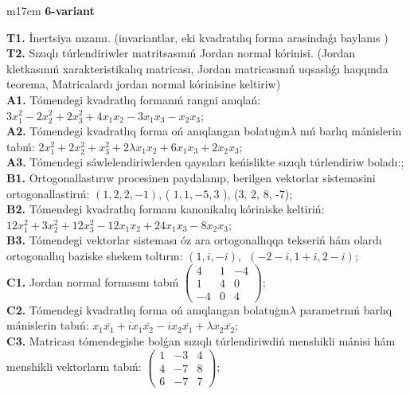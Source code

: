 \documentclass{article}
\begin{document}
\begin{tabular}{m{17cm}}
\textbf{6-variant}
\newline

\textbf{T1.} İnertsiya nızamı. (invariantlar,  eki kvadratılıq forma arasindaǵı baylanıs ) \\
\textbf{T2.} Sızıqlı túrlendiriwler matritsasınıń Jordan normal kórinisi. (Jordan kletkasınıń xarakteristikalıq matricası, Jordan matricasınıń uqsaslıǵı haqqında teorema,  Matricalardı jordan normal kórinisine keltiriw) \\
\textbf{A1.} Tómendegi kvadratlıq formanıń rangni anıqlań: \(3x_{1}^{2} - 2x_{2}^{2} + 2x_{3}^{2} + 4x_{1}x_{2} - 3x_{1}x_{3} - x_{2}x_{3}\); \\
\textbf{A2.} Tómendegi kvadratlıq forma oń anıqlangan bolatuģın\(\lambda\) nıń barlıq mánislerin tabıń: \(2x_{1}^{2} + 2x_{2}^{2} + x_{3}^{2} + 2\lambda x_{1}x_{2} + 6x_{1}x_{3} + 2x_{2}x_{3}\); \\
\textbf{A3.} Tómendegi sáwlelendiriwlerden qaysıları keńislikte sızıqlı túrlendiriw boladı:; \\
\textbf{B1.} Ortogonallastırıw procesinen paydalanıp, berilgen vektorlar sistemasini ortogonallastirıń: \((1,2,2, - 1)\), ( \(1,1, - 5,3\) ), (3, 2, 8, -7); \\
\textbf{B2.} Tómendegi kvadratlıq formanı kanonikalıq kóriniske keltiriń: \(12x_{1}^{2} + 3x_{2}^{2} + 12x_{3}^{2} - 12x_{1}x_{2} + 24x_{1}x_{3} - 8x_{2}x_{3}\); \\
\textbf{B3.} Tómendegi vektorlar sisteması óz ara ortogonallıqqa tekseriń hám olardı ortogonallıq baziske shekem toltırın: \((1,i, - i),\ \ ( - 2 - i,1 + i,2 - i)\); \\
\textbf{C1.} Jordan normal formasını tabıń \(\begin{pmatrix} 4 & 1 & - 4 \\ 1 & 4 & 0 \\  - 4 & 0 & 4 \end{pmatrix}\); \\
\textbf{C2.} Tómendegi kvadratlıq forma oń anıqlangan bolatuģın\(\lambda\) parametrnıń barlıq mánislerin tabıń: \(x_{1}\overline{x_{1}} + ix_{1}\overline{x_{2}} - ix_{2}\overline{x_{1}} + \lambda x_{2}\overline{x_{2}}\); \\
\textbf{C3.} Matricası tómendegishe bolǵan sızıqlı túrlendiriwdiń menshikli mánisi hám menshikli vektorların tabıń: \(\begin{pmatrix} 1 & - 3 & 4 \\ 4 & - 7 & 8 \\ 6 & - 7 & 7 \end{pmatrix}\); \\

\end{tabular}
\vspace{1cm}
\end{document}
